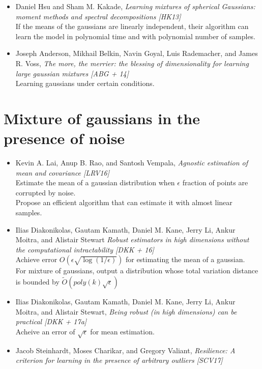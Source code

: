 \documentclass[12pt]{article}
\begin{document}
\begin{itemize}
		\item Daniel Hsu and Sham M. Kakade, {\em Learning mixtures of spherical Gaussians: moment methods and spectral decompositions [HK13]}\\
		If the  means  of  the  gaussians  are  linearly  independent,  their algorithm can learn the model in polynomial time and with polynomial number of samples.
		
		\item Joseph Anderson, Mikhail Belkin, Navin Goyal, Luis Rademacher, and James R. Voss, {\em The more, the merrier: the blessing of dimensionality for learning large gaussian mixtures [ABG + 14]}\\
		Learning gaussians under certain conditions.		
	\end{itemize}
	
\section{Mixture of gaussians in the presence of noise}
	\begin{itemize}
		\item Kevin A. Lai, Anup B. Rao, and Santosh Vempala, {\em Agnostic estimation of mean and covariance [LRV16]}\\
		Estimate the mean of a gaussian distribution when $\epsilon$ fraction of points are corrupted by noise.\\
		Propose an efficient algorithm that can estimate it with almost linear samples.
		
		\item Ilias Diakonikolas, Gautam Kamath, Daniel M. Kane, Jerry Li, Ankur Moitra, and Alistair Stewart {\em Robust estimators in high dimensions without the computational intractability [DKK + 16]}\\
		Achieve error $O(\epsilon\sqrt{\log (1/\epsilon)})$ for estimating the mean of a gaussian.\\
		For mixture of gaussians, output a distribution whose total variation distance is bounded by $\tilde O(poly(k)\sqrt\epsilon)$ 
		
		\item Ilias Diakonikolas, Gautam Kamath, Daniel M. Kane, Jerry Li, Ankur Moitra, and
Alistair Stewart, {\em Being robust (in high dimensions) can be practical [DKK + 17a]}\\
		Acheive an error of $\sqrt\epsilon$ for mean estimation.
		
		\item Jacob Steinhardt, Moses Charikar, and Gregory Valiant, {\em Resilience: A criterion for
learning in the presence of arbitrary outliers [SCV17]}\\
		
	\end{itemize}
	
\end{document}
